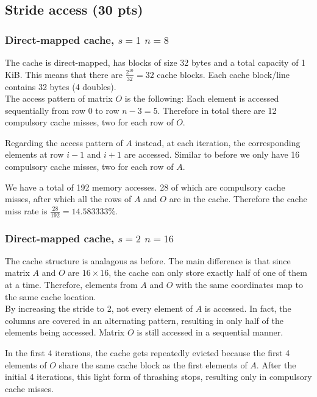 \renewcommand{\thesubsubsection}{\alph{subsubsection})}
\setcounter{section}{4}
\setcounter{subsection}{0}
\renewcommand{\thesubsubsection}{\alph{subsubsection})}

\subsection{Stride access (30 pts)}
\subsubsection{Direct-mapped cache, $s=1$ $n=8$}
The cache is direct-mapped, has blocks of size 32 bytes and a total capacity of 1 KiB. This means that there are $\frac{2^{10}}{32} = 32$ cache blocks. Each cache block/line contains 32 bytes (4 doubles).\\

The access pattern of matrix $O$ is the following: Each element is accessed sequentially from row $0$ to row $n-3=5$. Therefore in total there are 12 compulsory cache misses, two for each row of $O$.

Regarding the access pattern of $A$ instead, at each iteration, the corresponding elements at row $i-1$ and $i+1$ are accessed. Similar to before we only have 16 compulsory cache misses, two for each row of $A$.

We have a total of 192 memory accesses. 28 of which are compulsory cache misses, after which all the rows of $A$ and $O$ are in the cache. Therefore the cache miss rate is $\frac{28}{192}  = 14.583333\%$.\vspace*{-0.4cm}
\subsubsection{Direct-mapped cache, $s=2$ $n=16$}
The cache structure is analagous as before. The main difference is that since matrix $A$ and $O$ are $16\times16$, the cache can only store exactly half of one of them at a time. Therefore, elements from $A$ and $O$ with the same coordinates map to the same cache location.\\
By increasing the stride to 2, not every element of $A$ is accessed. In fact, the columns are covered in an alternating pattern, resulting in only half of the elements being accessed. Matrix $O$ is still accessed in a sequential manner.

In the first 4 iterations, the cache gets repeatedly evicted because the first 4 elements of $O$ share the same cache block as the first elements of $A$. After the initial 4 iterations, this light form of thrashing stops, resulting only in compulsory cache misses.

